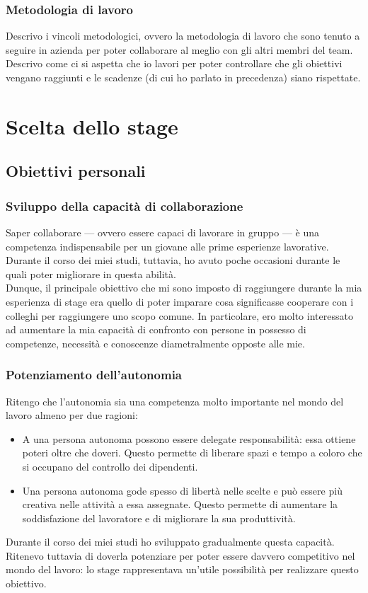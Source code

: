 		\subsubsection{Metodologia di lavoro}
			Descrivo i vincoli metodologici, ovvero la metodologia di lavoro che sono tenuto a seguire in azienda per poter collaborare
			al meglio con gli altri membri del team. Descrivo come ci si aspetta che io lavori per poter controllare che gli obiettivi
			vengano raggiunti e le scadenze (di cui ho parlato in precedenza) siano rispettate.
	\section{Scelta dello stage}
		\subsection{Obiettivi personali}
			\subsubsection{Sviluppo della capacità di collaborazione}
				Saper collaborare — ovvero essere capaci di lavorare in gruppo — è una competenza indispensabile per un giovane alle
				prime esperienze lavorative. Durante il corso dei miei studi, tuttavia, ho avuto poche occasioni durante le quali
				poter migliorare in questa abilità.\\
				Dunque, il principale obiettivo che mi sono imposto di raggiungere durante la mia esperienza di stage era quello di
				poter imparare cosa significasse cooperare con i colleghi per raggiungere uno scopo comune. In particolare, ero molto
				interessato ad aumentare la mia capacità di confronto con persone in possesso di competenze, necessità e conoscenze
				diametralmente opposte alle mie.
			\subsubsection{Potenziamento dell'autonomia}
				Ritengo che l'autonomia sia una competenza molto importante nel mondo del lavoro almeno per due ragioni:
				\begin{itemize}
					\item A una persona autonoma possono essere delegate responsabilità: essa ottiene poteri oltre che doveri.
					Questo permette di liberare spazi e tempo a coloro che si occupano del controllo dei dipendenti.
					\item Una persona autonoma gode spesso di libertà nelle scelte e può essere più creativa nelle attività a
					essa assegnate. Questo permette di aumentare la soddisfazione del lavoratore e di migliorare la sua
					produttività. 
				\end{itemize}
				Durante il corso dei miei studi ho sviluppato gradualmente questa capacità. Ritenevo tuttavia di doverla potenziare
				per poter essere davvero competitivo nel mondo del lavoro: lo stage rappresentava un'utile possibilità per realizzare
				questo obiettivo.
